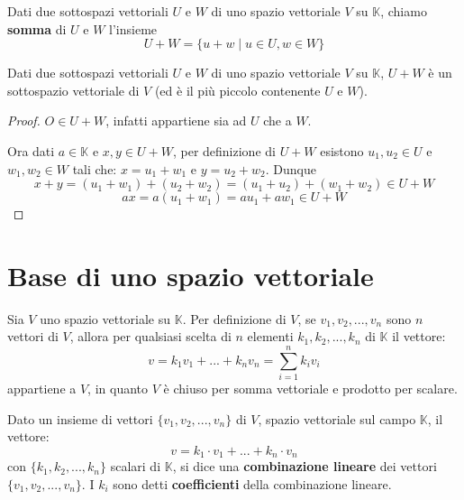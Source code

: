 \begin{defn}
	Dati due sottospazi vettoriali $U$ e $W$ di uno spazio vettoriale $V$
	su $\mathbb{K}$, chiamo \textbf{somma} di $U$ e $W$ l'insieme
	\begin{equation*}
		U + W = \{u + w \mid u \in U, w \in W\}
	\end{equation*}
\end{defn}

\begin{proposition}

	Dati due sottospazi vettoriali $U$ e $W$ di uno spazio vettoriale $V$
	su $\mathbb{K}$, $U + W$ \`e un sottospazio vettoriale di $V$ (ed
	\`e il pi\`u piccolo contenente $U$ e $W$).
	\begin{proof}
		$O \in U + W$, infatti appartiene sia ad $U$ che a $W$.

		Ora dati $a \in \mathbb{K}$ e $x, y \in U + W$, per definizione di
		$U + W$ esistono $u_1, u_2 \in U$ e $w_1, w_2 \in W$ tali che:
		$x = u_1 + w_1$ e $y = u_2 + w_2$. Dunque
		\begin{equation*}
			x + y = (u_1 + w_1) + (u_2 + w_2) = (u_1 + u_2) + (w_1 + w_2) \in U + W
		\end{equation*}
		\begin{equation*}
			ax = a(u_1 + w_1) = au_1 + aw_1 \in U + W
		\end{equation*}
	\end{proof}
\end{proposition}

\section{Base di uno spazio vettoriale}
Sia $V$ uno spazio vettoriale su $\mathbb{K}$.
Per definizione di $V$, se $v_1, v_2, ..., v_n$ sono $n$ vettori
di $V$, allora per qualsiasi scelta di $n$ elementi
$k_1, k_2, ..., k_n$ di $\mathbb{K}$ il vettore:
\begin{equation*}
	v = k_1 v_1 + ... + k_n v_n = \sum_{i=1}^n k_i v_i
\end{equation*}
appartiene a $V$, in quanto $V$ \`e chiuso per somma vettoriale
e prodotto per scalare.

\begin{defn}
	Dato un insieme di vettori $\{v_1, v_2, ..., v_n\}$ di $V$,
	spazio vettoriale sul campo $\mathbb{K}$, il vettore:
	\begin{equation*}
		v = k_1 \cdot v_1 + ... + k_n \cdot v_n
	\end{equation*}
	con $\{k_1, k_2, ..., k_n\}$ scalari di $\mathbb{K}$,
	si dice una \textbf{combinazione lineare} dei vettori
	$\{v_1, v_2, ..., v_n\}$. I $k_i$ sono detti \textbf{coefficienti}
	della combinazione lineare.
\end{defn}


